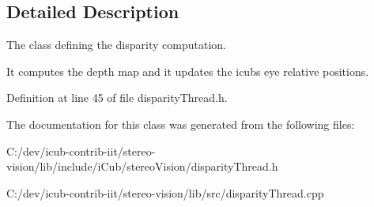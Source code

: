\subsection{Detailed Description}
The class defining the disparity computation. 

It computes the depth map and it updates the icub\textquotesingle{}s eye relative positions. 

Definition at line 45 of file disparity\+Thread.\+h.



The documentation for this class was generated from the following files\+:\begin{DoxyCompactItemize}
\item 
C\+:/dev/icub-\/contrib-\/iit/stereo-\/vision/lib/include/i\+Cub/stereo\+Vision/disparity\+Thread.\+h\item 
C\+:/dev/icub-\/contrib-\/iit/stereo-\/vision/lib/src/disparity\+Thread.\+cpp\end{DoxyCompactItemize}
